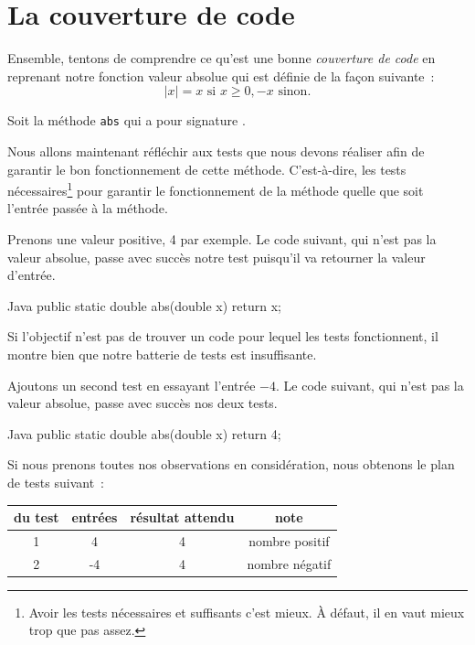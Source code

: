 \documentclass[a4paper,11pt]{style-esi/td}
\begin{document}
\section{La couverture de code}

	Ensemble, tentons de comprendre ce qu'est une bonne \emph{couverture de code} en reprenant notre fonction valeur absolue qui est définie de la façon suivante~:
	$$
		|x| = x \textrm{ si } x \geq 0, -x \textrm{ sinon}.
	$$

	Soit la méthode \texttt{abs} qui a pour signature .

	Nous allons maintenant réfléchir aux tests que nous devons réaliser afin de garantir le bon fonctionnement de cette méthode. C'est-à-dire, les tests nécessaires\footnote{Avoir les tests nécessaires et suffisants c'est mieux. À défaut, il en vaut mieux trop que pas assez.} pour garantir le fonctionnement de la méthode quelle que soit l'entrée passée à la méthode.

	Prenons une valeur positive, 4 par exemple. Le code suivant, qui n'est pas la valeur absolue, passe avec succès notre test puisqu'il va retourner la valeur d'entrée.
	\begin{Code}{Java}
		public static double abs(double x) {
			return x;
		}
	\end{Code}


	Si l'objectif n'est pas de trouver un code pour lequel les tests fonctionnent, il montre bien que notre batterie de tests est insuffisante.

	Ajoutons un second test en essayant l'entrée $-4$. Le code suivant, qui n'est pas la valeur absolue, passe avec succès nos deux tests. 

	\begin{Code}{Java}
		public static double abs(double x) {
			return 4;
		}
	\end{Code}

	Si nous prenons toutes nos observations en considération, nous obtenons le plan de tests suivant~:

	\begin{center}
		\begin{tabular}{|c|c|c|c|}
			\hline
			\no du test & entrées & résultat attendu & note \\
			\hline
			1 & 4 & 4 & nombre positif \\
			\hline
			2 & -4 & 4 & nombre négatif \\
			\hline
		\end{tabular}
	\end{center}
\end{document}
